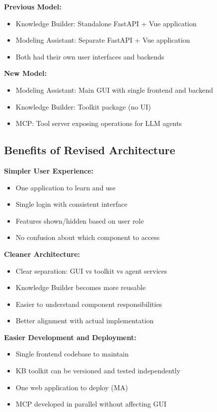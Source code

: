 \documentclass[12pt,a4paper]{article}
\begin{document}
\textbf{Previous Model:}
\begin{itemize}[noitemsep]
    \item Knowledge Builder: Standalone FastAPI + Vue application
    \item Modeling Assistant: Separate FastAPI + Vue application
    \item Both had their own user interfaces and backends
\end{itemize}

\textbf{New Model:}
\begin{itemize}[noitemsep]
    \item Modeling Assistant: Main GUI with single frontend and backend
    \item Knowledge Builder: Toolkit package (no UI)
    \item MCP: Tool server exposing operations for LLM agents
\end{itemize}

\subsection{Benefits of Revised Architecture}

\textbf{Simpler User Experience:}
\begin{itemize}[noitemsep]
    \item One application to learn and use
    \item Single login with consistent interface
    \item Features shown/hidden based on user role
    \item No confusion about which component to access
\end{itemize}

\textbf{Cleaner Architecture:}
\begin{itemize}[noitemsep]
    \item Clear separation: GUI vs toolkit vs agent services
    \item Knowledge Builder becomes more reusable
    \item Easier to understand component responsibilities
    \item Better alignment with actual implementation
\end{itemize}

\textbf{Easier Development and Deployment:}
\begin{itemize}[noitemsep]
    \item Single frontend codebase to maintain
    \item KB toolkit can be versioned and tested independently
    \item One web application to deploy (MA)
    \item MCP developed in parallel without affecting GUI
\end{itemize}
\end{document}
